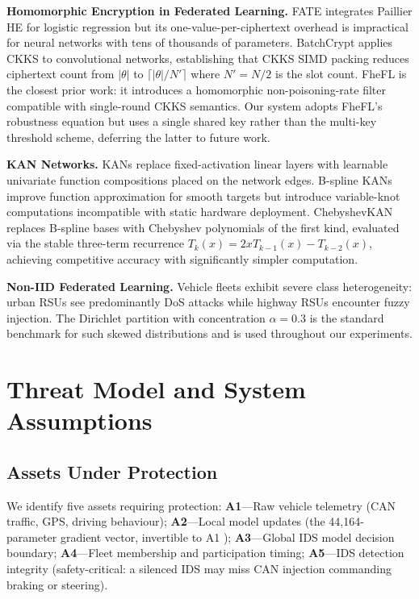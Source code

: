 \documentclass[conference]{IEEEtran}
\begin{document}
\textbf{Homomorphic Encryption in Federated Learning.}
FATE \cite{fate2019} integrates Paillier HE for logistic regression but its
one-value-per-ciphertext overhead is impractical for neural networks with
tens of thousands of parameters. BatchCrypt \cite{batchcrypt2020} applies
CKKS to convolutional networks, establishing that CKKS SIMD packing reduces
ciphertext count from $|\theta|$ to $\lceil|\theta|/N'\rceil$ where
$N'{=}N/2$ is the slot count. FheFL \cite{fhefl2023} is the closest prior
work: it introduces a homomorphic non-poisoning-rate filter compatible with
single-round CKKS semantics. Our system adopts FheFL's robustness equation
but uses a single shared key rather than the multi-key threshold scheme,
deferring the latter to future work.

\textbf{KAN Networks.}
KANs \cite{liu2024kan} replace fixed-activation linear layers with learnable
univariate function compositions placed on the network edges. B-spline KANs
improve function approximation for smooth targets but introduce variable-knot
computations incompatible with static hardware deployment. ChebyshevKAN
\cite{seydi2024chebykan} replaces B-spline bases with Chebyshev polynomials
of the first kind, evaluated via the stable three-term recurrence
$T_k(x){=}2x T_{k\!-\!1}(x){-}T_{k\!-\!2}(x)$, achieving competitive
accuracy with significantly simpler computation.

\textbf{Non-IID Federated Learning.}
Vehicle fleets exhibit severe class heterogeneity: urban RSUs see predominantly
DoS attacks while highway RSUs encounter fuzzy injection. The Dirichlet
partition \cite{hsieh2020quagmire} with concentration $\alpha{=}0.3$ is the
standard benchmark for such skewed distributions and is used throughout
our experiments.

\section{Threat Model and System Assumptions}

\subsection{Assets Under Protection}

We identify five assets requiring protection:
\textbf{A1}---Raw vehicle telemetry (CAN traffic, GPS, driving behaviour);
\textbf{A2}---Local model updates (the 44,164-parameter gradient vector,
invertible to A1 \cite{zhu2019deep});
\textbf{A3}---Global IDS model decision boundary;
\textbf{A4}---Fleet membership and participation timing;
\textbf{A5}---IDS detection integrity (safety-critical: a silenced IDS may
miss CAN injection commanding braking or steering).
\end{document}
